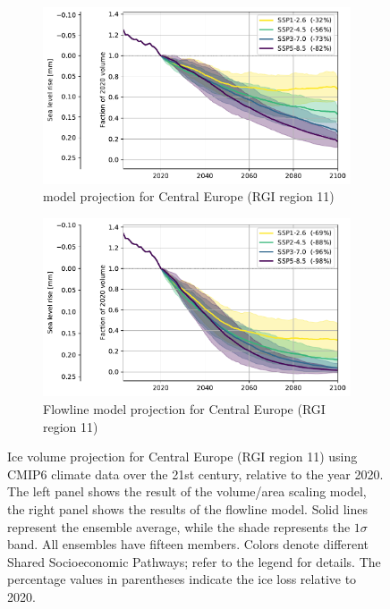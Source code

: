       \begin{figure}[htp]
          \centering
          \begin{subfigure}[b]{0.95\textwidth}
              \caption{\small \Vas{} model projection for Central Europe (RGI region 11) }
              \label{fig:cmip:vas_reg_11}
              \centering
              \includegraphics[width=\textwidth]{../plots/final_plots/time_series/cmip/cmip_vas_11.pdf}
          \end{subfigure}
          \vspace{1cm}

          \begin{subfigure}[b]{0.95\textwidth}
              \caption{\small Flowline model projection for Central Europe (RGI region 11) }
              \label{fig:cmip:fl_reg_11}
              \centering
              \includegraphics[width=\textwidth]{../plots/final_plots/time_series/cmip/cmip_fl_11.pdf}
          \end{subfigure}
          \vspace{1cm}

          \caption{Ice volume projection for Central Europe (RGI region 11) using CMIP6 climate data over the 21st century, relative to the year 2020. The left panel shows the result of the volume/area scaling model, the right panel shows the results of the flowline model. Solid lines represent the ensemble average, while the shade represents the $1\sigma$ band. All ensembles have fifteen members. Colors denote different Shared Socioeconomic Pathways; refer to the legend for details. The percentage values in parentheses indicate the ice loss relative to 2020.}
          \label{fig:cmip_alps}
      \end{figure}

